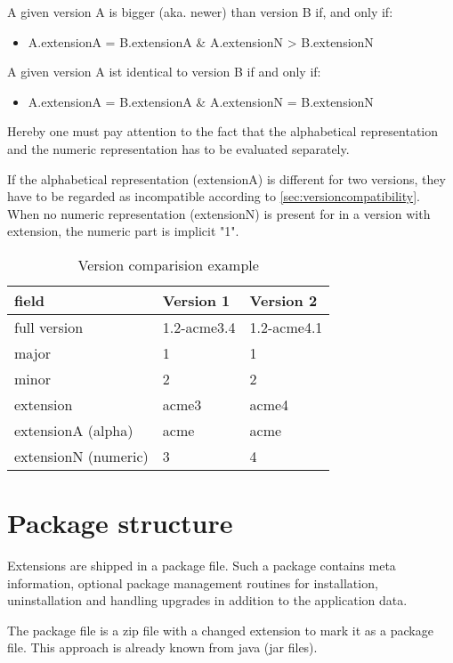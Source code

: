 A given version A is bigger (aka. newer) than version B if, and only if:
\begin{itemize}
\item A.extensionA = B.extensionA \& A.extensionN > B.extensionN
\end{itemize}

A given version A ist identical to version B if and only if:
\begin{itemize}
\item A.extensionA = B.extensionA \& A.extensionN = B.extensionN
\end{itemize}

Hereby one must pay attention to the fact that the alphabetical representation and the numeric representation has to be evaluated separately.

If the alphabetical representation (extensionA) is different for two versions, they have to be regarded as incompatible according to \ref{sec:versioncompatibility}. When no numeric representation (extensionN) is present for in a version with extension, the numeric part is implicit "1".

\small
\begin{longtable}{|p{}|p{}|p{}|}
\caption{Version comparision example} \\
\hline
\label{tab:versioncompareexamples}
\textbf{field} & \textbf{Version 1} & \textbf{Version 2} \\
\hline
full version & 1.2-acme3.4 & 1.2-acme4.1
\\ \hline
major & 1 & 1
\\ \hline
minor & 2 & 2
\\ \hline
extension & acme3 & acme4
\\ \hline
extensionA (alpha) & acme & acme
\\ \hline
extensionN (numeric) & 3 & 4
\\ \hline
\end{longtable}
\normalsize

\section[sec:packet structure]{Package structure}
Extensions are shipped in a package file. Such a package contains meta information, optional package management routines for installation, uninstallation and handling upgrades in addition to the application data.

The package file is a zip file with a changed extension to mark it as a package file. This approach is already known \ie from java (jar files).

